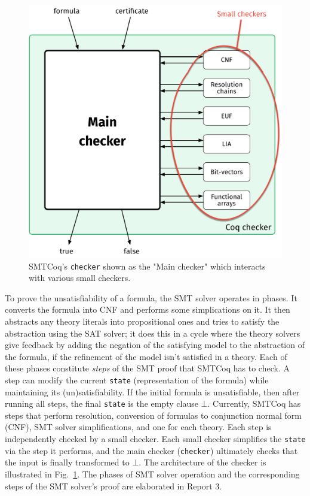 \documentclass{article}
\begin{document}
	\begin{figure}[t]
		\begin{center}
			\includegraphics[scale=0.3]{checker}
			\caption{SMTCoq's \texttt{checker}
				shown as the "Main checker" which 
				interacts with various small checkers.}
			\label{fig:checker}
		\end{center}
	\end{figure}
	
	To prove the unsatisfiability of a 
	formula, the SMT solver operates in 
	phases. It converts the formula into
	CNF and performs some simplications
	on it. It then abstracts any theory
	literals into propositional ones 
	and tries to satisfy the abstraction 
	using the SAT solver; it does this
	in a cycle where the theory
	solvers give feedback
	by adding the negation of the 
	satisfying model to the 
	abstraction of the formula, if the 
	refinement of the model isn't 
	satisfied in a theory. 
	Each of these phases constitute
	\textit{steps} of the SMT proof
	that SMTCoq has to check. A step
	can modify the current 
	\texttt{state} (representation of 
	the formula) while maintaining 
	its (un)satisfiability. If the 
	initial formula is unsatisfiable, 
	then after running all steps,
	the final \texttt{state} is the 
	empty clause $\bot$. Currently, 
	SMTCoq has steps that perform 
	resolution, conversion of formulas 
	to conjunction normal form (CNF), SMT 
	solver simplifications, and one for 
	each theory. Each step is 
	independently checked by a small 
	checker. Each small
	checker simplifies the  
	\texttt{state} via the step it 
	performs, and the main checker 
	(\texttt{checker}) ultimately checks 
	that the input is 
	finally transformed to $\bot$. The 
	architecture of the checker is 
	illustrated in
	Fig.~\ref{fig:checker}. The phases 
	of SMT solver operation and the 
	corresponding steps of the
	SMT solver's proof are elaborated
	in Report 3.
	
\end{document}
